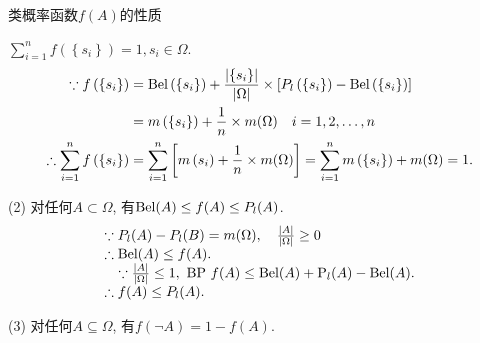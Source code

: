 类概率函数$f(A)$的性质

 $\sum_{i=1}^{n} f\left(\left\{s_{i}\right\}\right)=1, s_{i}\in \Omega$.
\begin{align*}
\because f\left(\left\{s_{i}\right\}\right) &=\textup{Bel}\left(\left\{s_{i}\right\}\right)+\frac{\left|\left\{s_{i}\right\}\right|}{|\Omega|} \times\left[P_l\left(\left\{s_{i}\right\}\right)-\textup{Bel}\left(\left\{s_{i}\right\}\right)\right] \notag\\
  &=m\left(\left\{s_{i}\right\}\right)+\frac{1}{n} \times m(\Omega) \quad i=1,2, \ldots, n \\
\therefore \sum_{i=1}^{n} f\left(\left\{s_{i}\right\}\right)
    &=\sum_{i=1}^{n}\left[m\left(s_{i}\right)+\frac{1}{n} \times m(\Omega)\right]
   =\sum_{i=1}^{n} m\left(\left\{s_{i}\right\}\right)+m(\Omega)=1.
\end{align*}

(2) 对任何$A\subset\Omega$, 有$\textup{Bel}(A)\leq f(A)\leq P_l(A)$.
\begin{align}
\begin{array}{l}
{\because P_l(A)-P_l(B)=m(\Omega), \quad \frac{|A|}{|\Omega|} \geq 0} \\
{\therefore \textup{Bel}(A) \leq f(A)}. \\
 {\quad \because \frac{|A|}{|\Omega|} \leq 1, \text { BP } f(A) \leq \textup{Bel}(A)+\textup{P}_l(A)-\textup{Bel}(A)}.\\
  \therefore f(A) \leq P_l(A).
  \end{array}
\end{align}

(3) 对任何$A \subseteq \Omega$, 有$f(\neg A)=1-f(A)$.

